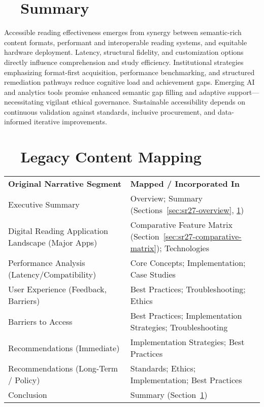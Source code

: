 \section{~~Summary}
\label{sec:sr27-summary}
Accessible reading effectiveness emerges from synergy between semantic-rich content formats, performant and interoperable reading systems, and equitable hardware deployment. Latency, structural fidelity, and customization options directly influence comprehension and study efficiency. Institutional strategies emphasizing format-first acquisition, performance benchmarking, and structured remediation pathways reduce cognitive load and achievement gaps. Emerging AI and analytics tools promise enhanced semantic gap filling and adaptive support—necessitating vigilant ethical governance. Sustainable accessibility depends on continuous validation against standards, inclusive procurement, and data-informed iterative improvements.

\section{~~Legacy Content Mapping}
\label{sec:sr27-legacy-mapping}
\begin{tabular}{p{} p{}}
	\textbf{Original Narrative Segment}                & \textbf{Mapped / Incorporated In}                                                    \\
	Executive Summary                                  & Overview; Summary (Sections~\ref{sec:sr27-overview}, \ref{sec:sr27-summary})         \\
	Digital Reading Application Landscape (Major Apps) & Comparative Feature Matrix (Section~\ref{sec:sr27-comparative-matrix}); Technologies \\
	Performance Analysis (Latency/Compatibility)       & Core Concepts; Implementation; Case Studies                                          \\
	User Experience (Feedback, Barriers)               & Best Practices; Troubleshooting; Ethics                                              \\
	Barriers to Access                                 & Best Practices; Implementation Strategies; Troubleshooting                           \\
	Recommendations (Immediate)                        & Implementation Strategies; Best Practices                                            \\
	Recommendations (Long-Term / Policy)               & Standards; Ethics; Implementation; Best Practices                                    \\
	Conclusion                                         & Summary (Section~\ref{sec:sr27-summary})                                             \\
\end{tabular}

